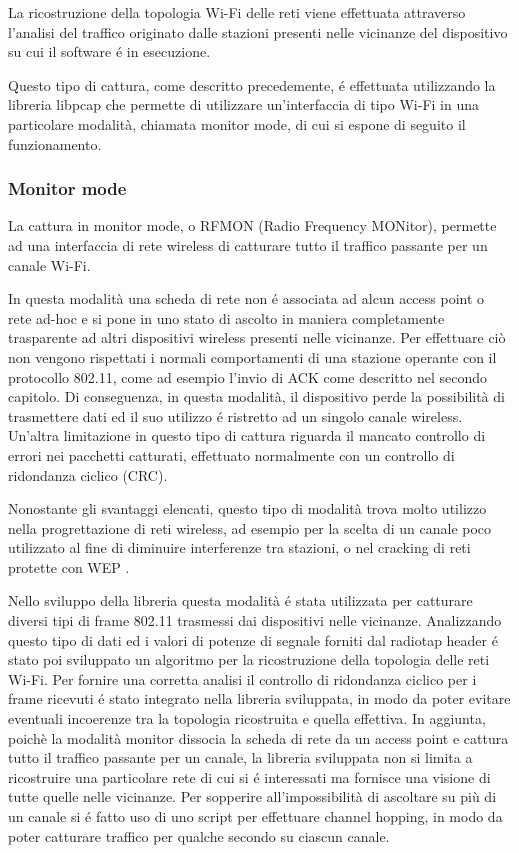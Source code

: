La ricostruzione della topologia Wi-Fi delle reti viene effettuata attraverso l'analisi del traffico originato dalle stazioni presenti nelle vicinanze del dispositivo su cui il software \'e in esecuzione.

Questo tipo di cattura, come descritto precedemente, \'e effettuata utilizzando la libreria libpcap che permette di utilizzare un'interfaccia di tipo Wi-Fi in una particolare modalit\`a, chiamata monitor mode, di cui si espone di seguito il funzionamento.

\subsubsection{Monitor mode}
La cattura in monitor mode, o RFMON (Radio Frequency MONitor), permette ad una interfaccia di rete wireless di catturare tutto il traffico passante per un canale Wi-Fi.

In questa modalit\`a una scheda di rete non \'e associata ad alcun access point o rete ad-hoc e si pone in uno stato di ascolto in maniera completamente trasparente ad altri dispositivi wireless presenti nelle vicinanze.
Per effettuare ci\`o non vengono rispettati i normali comportamenti di una stazione operante con il protocollo 802.11, come ad esempio l'invio di ACK come descritto nel secondo capitolo.
Di conseguenza, in questa modalit\`a, il dispositivo perde la possibilit\`a di trasmettere dati ed il suo utilizzo \'e ristretto ad un singolo canale wireless.
Un'altra limitazione in questo tipo di cattura riguarda il mancato controllo di errori nei pacchetti catturati, effettuato normalmente con un controllo di ridondanza ciclico (CRC).

Nonostante gli svantaggi elencati, questo tipo di modalit\`a trova molto utilizzo nella progrettazione di reti wireless, ad esempio per la scelta di un canale poco utilizzato al fine di diminuire interferenze tra stazioni, o nel cracking di reti protette con WEP .

Nello sviluppo della libreria questa modalit\`a \'e stata utilizzata per catturare diversi tipi di frame 802.11 trasmessi dai dispositivi nelle vicinanze.
Analizzando questo tipo di dati ed i valori di potenze di segnale forniti dal radiotap header \'e stato poi sviluppato un algoritmo per la ricostruzione della topologia delle reti Wi-Fi.
Per fornire una corretta analisi il controllo di ridondanza ciclico per i frame ricevuti  \'e stato integrato nella libreria sviluppata, in modo da poter evitare eventuali incoerenze tra la topologia ricostruita e quella effettiva.
In aggiunta, poich\`e la modalit\`a monitor dissocia la scheda di rete da un access point e cattura tutto il traffico passante per un canale, la libreria sviluppata non si limita a ricostruire una particolare rete di cui si \'e interessati ma fornisce una visione di tutte quelle nelle vicinanze.
Per sopperire all'impossibilit\`a di ascoltare su pi\`u di un canale si \'e fatto uso di uno script per effettuare channel hopping, in modo da poter catturare traffico per qualche secondo su ciascun canale.

